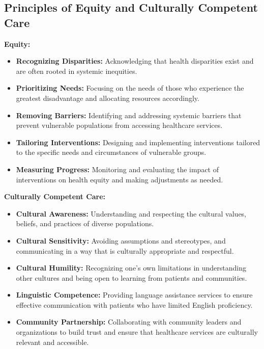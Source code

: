 \documentclass[12pt,a4paper]{article}
\begin{document}
\subsection*{Principles of Equity and Culturally Competent Care}

\textbf{Equity:}
\begin{itemize}
    \item \textbf{Recognizing Disparities:} Acknowledging that health disparities exist and are often rooted in systemic inequities.
    \item \textbf{Prioritizing Needs:} Focusing on the needs of those who experience the greatest disadvantage and allocating resources accordingly.
    \item \textbf{Removing Barriers:} Identifying and addressing systemic barriers that prevent vulnerable populations from accessing healthcare services.
    \item \textbf{Tailoring Interventions:} Designing and implementing interventions tailored to the specific needs and circumstances of vulnerable groups.
    \item \textbf{Measuring Progress:} Monitoring and evaluating the impact of interventions on health equity and making adjustments as needed.
\end{itemize}

\textbf{Culturally Competent Care:}
\begin{itemize}
    \item \textbf{Cultural Awareness:} Understanding and respecting the cultural values, beliefs, and practices of diverse populations.
    \item \textbf{Cultural Sensitivity:} Avoiding assumptions and stereotypes, and communicating in a way that is culturally appropriate and respectful.
    \item \textbf{Cultural Humility:} Recognizing one's own limitations in understanding other cultures and being open to learning from patients and communities.
    \item \textbf{Linguistic Competence:} Providing language assistance services to ensure effective communication with patients who have limited English proficiency.
    \item \textbf{Community Partnership:} Collaborating with community leaders and organizations to build trust and ensure that healthcare services are culturally relevant and accessible.
\end{itemize}
\end{document}
